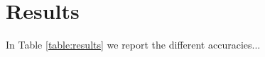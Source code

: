 
\section{Results}
\label{sec:results}

In Table \ref{table:results} we report the different accuracies...
%
%
%
%
